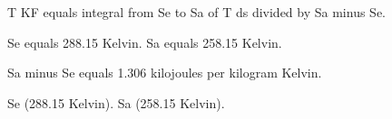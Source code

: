 T KF equals integral from Se to Sa of T ds divided by Sa minus Se.  

Se equals 288.15 Kelvin.  
Sa equals 258.15 Kelvin.  

Sa minus Se equals 1.306 kilojoules per kilogram Kelvin.  

Se (288.15 Kelvin).  
Sa (258.15 Kelvin).